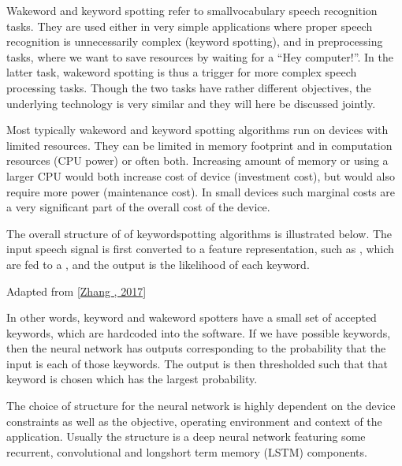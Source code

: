 \documentclass[letterpaper,10pt,english]{jupyterBook}
\begin{document}
\sphinxAtStartPar
Wake\sphinxhyphen{}word and keyword spotting refer to small\sphinxhyphen{}vocabulary speech
recognition tasks. They are used either in very simple applications
where proper speech recognition is unnecessarily complex (keyword
spotting), and in pre\sphinxhyphen{}processing tasks, where we want to save resources
by waiting for a “Hey computer!”. In the latter task, wake\sphinxhyphen{}word spotting
is thus a trigger for more complex speech processing tasks. Though the
two tasks have rather different objectives, the underlying technology is
very similar and they will here be discussed jointly.

\sphinxAtStartPar
Most typically wake\sphinxhyphen{}word and keyword spotting algorithms run on devices
with limited resources. They can be limited in memory footprint and in
computation resources (CPU power) or often both. Increasing amount of
memory or using a larger CPU would both increase cost of device
(investment cost), but would also require more power (maintenance cost).
In small devices such marginal costs are a very significant part of the
overall cost of the device.

\sphinxAtStartPar
The overall structure of of keyword\sphinxhyphen{}spotting algorithms is illustrated
below. The input speech signal is first converted to a feature
representation, such as , which are fed to a
, and the output is the likelihood of
each keyword.

\sphinxAtStartPar
{}

\sphinxAtStartPar
Adapted from {[}\hyperlink{cite.References:id44}{Zhang , 2017}{]}

\sphinxAtStartPar
In other words, keyword and wake\sphinxhyphen{}word spotters have a small set of
accepted keywords, which are hard\sphinxhyphen{}coded into the software. If we have
 possible keywords, then the neural network has  outputs
corresponding to the probability that the input is each of those
keywords. The output is then thresholded such that that keyword is
chosen which has the largest probability.

\sphinxAtStartPar
The choice of structure for the neural network is highly dependent on
the device constraints as well as the objective, operating environment
and context of the application. Usually the structure is a deep neural
network featuring some recurrent, convolutional and long\sphinxhyphen{}short term
memory (LSTM) components.
\end{document}
